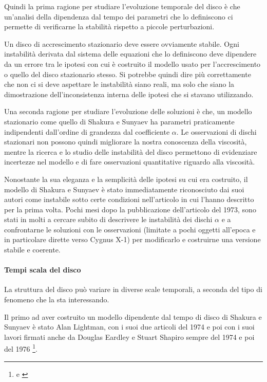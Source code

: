 \documentclass[a4paperbi]{article}
\begin{document}
	Quindi la prima ragione per studiare l'evoluzione temporale del disco è che un'analisi della dipendenza dal tempo dei parametri che lo definiscono ci permette di verificarne la stabilità rispetto a piccole perturbazioni. 
	
	Un disco di accrescimento stazionario deve essere ovviamente stabile. Ogni instabilità derivata dal sistema delle equazioni che lo definiscono deve dipendere da un errore tra le ipotesi con cui è costruito il modello usato per l'accrescimento o quello del disco stazionario stesso. Si potrebbe quindi dire più correttamente che non ci si deve aspettare le instabilità siano reali, ma solo che siano la dimostrazione dell'inconsistenza interna delle ipotesi che si stavano utilizzando.
	
	Una seconda ragione per studiare l'evoluzione delle soluzioni è che, un modello stazionario come quello di Shakura e Sunyaev ha parametri praticamente indipendenti dall'ordine di grandezza dal coefficiente $\alpha$. Le osservazioni di dischi stazionari non possono quindi migliorare la nostra conoscenza della viscosità, mentre la ricerca e lo studio delle instabilità del disco permettono di evidenziare incertezze nel modello e di fare osservazioni quantitative riguardo alla viscosità.
	
	Nonostante la sua eleganza e la semplicità delle ipotesi su cui era costruito, il modello di Shakura e Sunyaev è stato immediatamente riconosciuto dai suoi autori come instabile sotto certe condizioni nell'articolo in cui l'hanno descritto per la prima volta. Pochi mesi dopo la pubblicazione dell'articolo del 1973, sono stati in molti a cercare subito di descrivere le instabilità dei dischi $\alpha$ e a confrontarne le soluzioni con le osservazioni (limitate a pochi oggetti all'epoca e in particolare dirette verso Cygnus X-1) per modificarlo e costruirne una versione stabile e coerente.
	
	\paragraph{Tempi scala del disco}	

	La struttura del disco può variare in diverse scale temporali, a seconda del tipo di fenomeno che la sta interessando. 	
	
	Il primo ad aver costruito un modello dipendente dal tempo di disco di Shakura e Sunyaev è stato Alan Lightman, con i suoi due articoli del 1974 e poi con i suoi lavori firmati anche da Douglas Eardley e Stuart Shapiro sempre del 1974 e poi del 1976 \footnote{\cite{LightmanEardley1974} e \cite{ShapiroLightmanEardley1976}}. 
	
\end{document}
